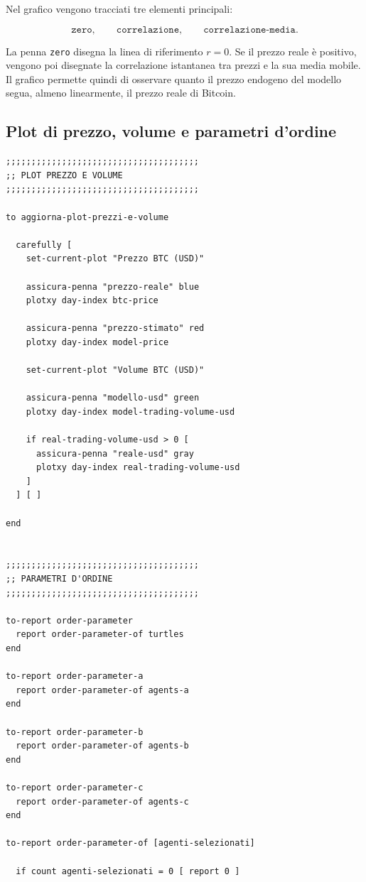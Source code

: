 Nel grafico vengono tracciati tre elementi principali:

\[
\texttt{zero},
\qquad
\texttt{correlazione},
\qquad
\texttt{correlazione-media}.
\]

La penna \texttt{zero} disegna la linea di riferimento \(r=0\). Se il prezzo
reale è positivo, vengono poi disegnate la correlazione istantanea tra prezzi e
la sua media mobile. Il grafico permette quindi di osservare quanto il prezzo
endogeno del modello segua, almeno linearmente, il prezzo reale di Bitcoin.

\subsection{Plot di prezzo, volume e parametri d'ordine}

\begin{lstlisting}[caption={Aggiornamento dei plot e calcolo dei parametri d'ordine}]
;;;;;;;;;;;;;;;;;;;;;;;;;;;;;;;;;;;;;;
;; PLOT PREZZO E VOLUME
;;;;;;;;;;;;;;;;;;;;;;;;;;;;;;;;;;;;;;

to aggiorna-plot-prezzi-e-volume

  carefully [
    set-current-plot "Prezzo BTC (USD)"

    assicura-penna "prezzo-reale" blue
    plotxy day-index btc-price

    assicura-penna "prezzo-stimato" red
    plotxy day-index model-price

    set-current-plot "Volume BTC (USD)"

    assicura-penna "modello-usd" green
    plotxy day-index model-trading-volume-usd

    if real-trading-volume-usd > 0 [
      assicura-penna "reale-usd" gray
      plotxy day-index real-trading-volume-usd
    ]
  ] [ ]

end


;;;;;;;;;;;;;;;;;;;;;;;;;;;;;;;;;;;;;;
;; PARAMETRI D'ORDINE
;;;;;;;;;;;;;;;;;;;;;;;;;;;;;;;;;;;;;;

to-report order-parameter
  report order-parameter-of turtles
end

to-report order-parameter-a
  report order-parameter-of agents-a
end

to-report order-parameter-b
  report order-parameter-of agents-b
end

to-report order-parameter-c
  report order-parameter-of agents-c
end

to-report order-parameter-of [agenti-selezionati]

  if count agenti-selezionati = 0 [ report 0 ]


\end{lstlisting}
